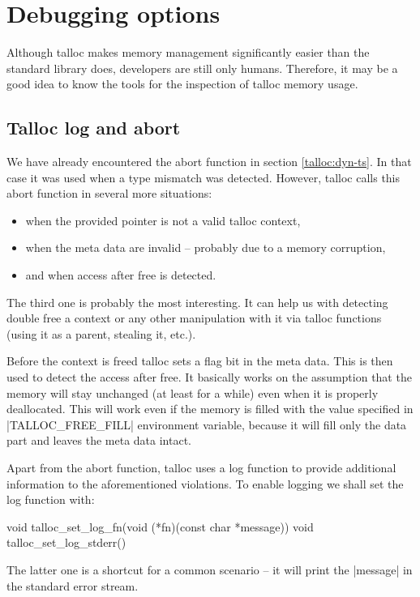 \section{Debugging options}
\label{talloc:sec:debugging}

Although talloc makes memory management significantly easier than the standard
library does, developers are still only humans. Therefore, it may be a good idea
to know the tools for the inspection of talloc memory usage.

\subsection{Talloc log and abort}

We have already encountered the abort function in section \ref{talloc:dyn-ts}.
In that case it was used when a type mismatch was detected. However, talloc
calls this abort function in several more situations:

\begin{itemize}
  \item when the provided pointer is not a valid talloc context,
  \item when the meta data are invalid -- probably due to a memory corruption,
  \item and when access after free is detected.
\end{itemize}

The third one is probably the most interesting. It can help us with detecting
double free a context or any other manipulation with it via talloc functions
(using it as a parent, stealing it, etc.).

Before the context is freed talloc sets a flag bit in the meta data. This is
then used to detect the access after free. It basically works on the assumption
that the memory will stay unchanged (at least for a while) even when it is
properly deallocated. This will work even if the memory is filled with the
value specified in |TALLOC_FREE_FILL| environment variable, because it will
fill only the data part and leaves the meta data intact.

Apart from the abort function, talloc uses a log function to provide additional
information to the aforementioned violations. To enable logging we shall set the
log function with:

\begin{funcproto}
void talloc_set_log_fn(void (*fn)(const char *message))
void talloc_set_log_stderr()
\end{funcproto}
\funclistend
The latter one is a shortcut for a common scenario -- it will print the
|message| in the standard error stream.


